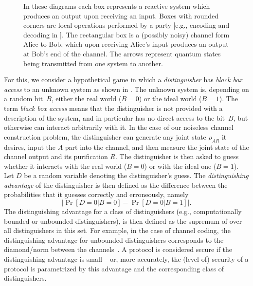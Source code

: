 \begin{figure}[tb]
{
}
\caption[Channels for error
correcting]{\label{fig:security.channels}In these diagrams each box
  represents a reactive system which produces an output upon receiving
  an input. Boxes with rounded corners are local operations performed
  by a party [e.g., encoding and decoding in
  ]. The rectangular box is
  a (possibly noisy) channel form Alice to Bob, which upon receiving
  Alice's input produces an output at Bob's end of the channel. The
  arrows represent quantum states being transmitted from one system to
  another.}
\end{figure}

For this, we consider a hypothetical game in which a
\emph{distinguisher} has \emph{black box access} to an unknown system
as shown in . The unknown system is,
depending on a random bit~$B$, either the real world ($B=0$) or the
ideal world ($B=1$). The term \emph{black box access} means that the
distinguisher is not provided with a description of the system, and in
particular has no direct access to the bit~$B$, but otherwise can
interact arbitrarily with it. In the case of our noiseless channel
construction problem, the distinguisher can generate any joint state
$\rho_{AR}$ it desires, input the $A$ part into the channel, and then
measure the joint state of the channel output and its purification
$R$.  The distinguisher is then asked to guess whether it interacts
with the real world ($B=0$) or with the ideal one ($B=1$). Let $D$ be
a random variable denoting the distinguisher's guess. The
\emph{distinguishing advantage} of the distinguisher is then defined as the
difference between the probabilities that it guesses correctly and
erroneously, namely
\begin{equation} \label{eq:adv1} \left|\Pr[D = 0|B=0] - \Pr[D = 0|B=1]
  \right|.\end{equation} The distinguishing advantage for a class of
distinguishers (e.g., computationally bounded or unbounded
distinguishers), is then defined as the supremum of 
over all distinguishers in this set. For example, in the case of channel coding, the distinguishing advantage for unbounded
distinguishers corresponds to the diamond\-/norm between the
channels~\cite{Wat18}. A protocol is considered secure if the
distinguishing advantage is small \--- or, more accurately, the (level
of) security of a protocol is parametrized by this advantage and the
corresponding class of distinguishers.

